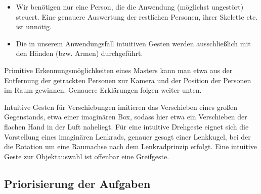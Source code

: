 	\begin{itemize}
		\item Wir benötigen nur eine Person, die die Anwendung (möglichst ungestört) steuert. Eine genauere Auswertung der restlichen Personen, ihrer Skelette etc. ist unnötig.
		\item Die in unserem Anwendungsfall intuitiven Gesten werden ausschließlich mit den Händen (bzw. Armen) durchgeführt.
	\end{itemize}
	Primitive Erkennungsmöglichkeiten eines Masters kann man etwa aus der Entfernung der getrackten Personen zur Kamera und der Position der Personen im Raum gewinnen. Genauere Erklärungen folgen weiter unten.\par 
	Intuitive Gesten für Verschiebungen imitieren das Verschieben eines großen Gegenstands, etwa einer imaginären Box, sodass hier etwa ein Verschieben der flachen Hand in der Luft naheliegt. Für eine intuitive Drehgeste eignet sich die Vorstellung eines imaginären Lenkrads, genauer gesagt einer Lenkkugel, bei der die Rotation um eine Raumachse nach dem Lenkradprinzip erfolgt. Eine intuitive Geste zur Objektauswahl ist offenbar eine Greifgeste.
	\subsection{Priorisierung der Aufgaben}
